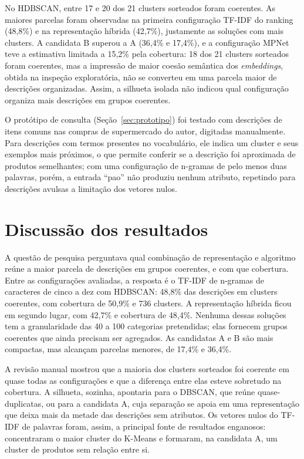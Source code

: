 \documentclass[english,brazilian]{UNISINOSmonografia}
\begin{document}
No HDBSCAN, entre 17 e 20 dos 21 clusters sorteados foram coerentes. As maiores parcelas foram observadas na primeira configuração TF-IDF do ranking (48,8\%) e na representação híbrida (42,7\%), justamente as soluções com mais clusters. A candidata B superou a A (36,4\% e 17,4\%), e a configuração MPNet teve a estimativa limitada a 15,2\% pela cobertura: 18 dos 21 clusters sorteados foram coerentes, mas a impressão de maior coesão semântica dos \textit{embeddings}, obtida na inspeção exploratória, não se converteu em uma parcela maior de descrições organizadas. Assim, a silhueta isolada não indicou qual configuração organiza mais descrições em grupos coerentes.

O protótipo de consulta (Seção~\ref{sec:prototipo}) foi testado com descrições de itens comuns nas compras de supermercado do autor, digitadas manualmente. Para descrições com termos presentes no vocabulário, ele indica um cluster e seus exemplos mais próximos, o que permite conferir se a descrição foi aproximada de produtos semelhantes; com uma configuração de n-gramas de pelo menos duas palavras, porém, a entrada ``pao'' não produziu nenhum atributo, repetindo para descrições avulsas a limitação dos vetores nulos.

\section{Discussão dos resultados}
\label{sec:discussao}

A questão de pesquisa perguntava qual combinação de representação e algoritmo reúne a maior parcela de descrições em grupos coerentes, e com que cobertura. Entre as configurações avaliadas, a resposta é o TF-IDF de n-gramas de caracteres de cinco a dez com HDBSCAN: 48,8\% das descrições em clusters coerentes, com cobertura de 50,9\% e 736 clusters. A representação híbrida ficou em segundo lugar, com 42,7\% e cobertura de 48,4\%. Nenhuma dessas soluções tem a granularidade das 40 a 100 categorias pretendidas; elas fornecem grupos coerentes que ainda precisam ser agregados. As candidatas A e B são mais compactas, mas alcançam parcelas menores, de 17,4\% e 36,4\%.

A revisão manual mostrou que a maioria dos clusters sorteados foi coerente em quase todas as configurações e que a diferença entre elas esteve sobretudo na cobertura. A silhueta, sozinha, apontaria para o DBSCAN, que reúne quase-duplicatas, ou para a candidata A, cuja separação se apoia em uma representação que deixa mais da metade das descrições sem atributos. Os vetores nulos do TF-IDF de palavras foram, assim, a principal fonte de resultados enganosos: concentraram o maior cluster do K-Means e formaram, na candidata A, um cluster de produtos sem relação entre si.
\end{document}
